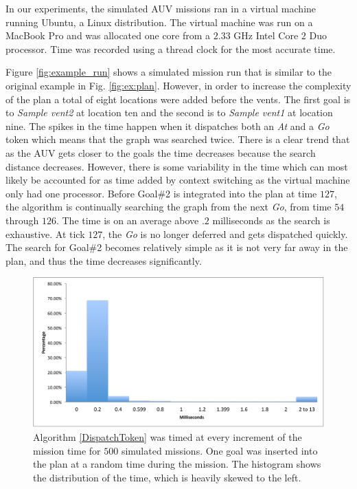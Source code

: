 In our experiments, the simulated AUV missions ran in a virtual
machine running Ubuntu, a Linux distribution. The virtual machine was
run on a MacBook Pro and was allocated one core from
a $2.33$ GHz Intel Core $2$ Duo processor. Time was
recorded using a thread clock for the most accurate time.

Figure \ref{fig:example_run} shows a simulated mission run that
is similar to the original example in Fig. \ref{fig:ex:plan}.
However, in order to increase the complexity of the plan a
total of eight locations were added before the vents. The first goal is to
{\em Sample vent2} at location ten and the second is to {\em Sample
  vent1} at location nine. The spikes in the time happen when it
dispatches both an {\em At} and a {\em Go} token which means that the graph
was searched twice. There is a clear trend that as the AUV gets
closer to the goals the time decreases because the search distance
decreases.  However, there is some variability in the time which can
most likely be accounted for as time added by context switching as the
virtual machine only had one processor. Before Goal\#2 is integrated
into the plan at time $127$, the algorithm is continually searching the
graph from the next {\em Go}, from time $54$ through $126$. The time is on an average above $.2$
milliseconds as the search is exhaustive. At tick $127$, the {\em Go} is no longer deferred and gets
dispatched quickly. The search for Goal\#2 becomes relatively simple as it is
not very far away in the plan, and thus the time decreases
significantly.

\begin{figure}[!htbp]
  \centering
  \includegraphics[width=\columnwidth]{figs/HistogramAlg1}
  \caption{\small Algorithm \ref{DispatchToken} was 
  timed at every increment of the mission time for $500$ 
  simulated missions. One goal was inserted into the plan 
  at a random time during the mission. The histogram shows 
  the distribution of the time, which is heavily skewed to the left.}
  \label{fig:histogram}
\end{figure}

